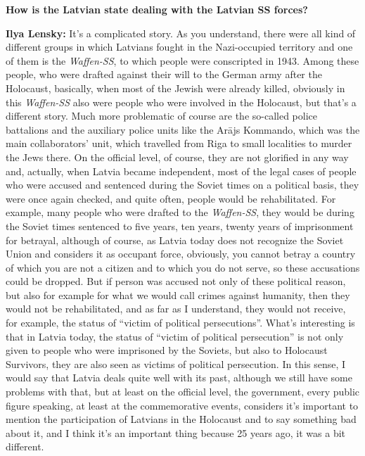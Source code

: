 \textbf{How is the Latvian state dealing with the Latvian SS forces?}

\textbf{Ilya Lensky:} It’s a complicated story. As you understand, there were all kind of different groups in which Latvians fought in the Nazi-occupied territory and one of them is the \textit{Waffen-SS}, to which people were conscripted in 1943. Among these people, who were drafted against their will to the German army after the Holocaust, basically, when most of the Jewish were already killed, obviously in this \textit{Waffen-SS} also were people who were involved in the Holocaust, but that’s a different story. Much more problematic of course are the so-called police battalions and the auxiliary police units like the Arājs Kommando, which was the main collaborators’ unit, which travelled from Riga to small localities to murder the Jews there. On the official level, of course, they are not glorified in any way and, actually, when Latvia became independent, most of the legal cases of people who were accused and sentenced during the Soviet times on a political basis, they were once again checked, and quite often, people would be rehabilitated. For example, many people who were drafted to the \textit{Waffen-SS}, they would be during the Soviet times sentenced to five years, ten years, twenty years of imprisonment for betrayal, although of course, as Latvia today does not recognize the Soviet Union and considers it as occupant force, obviously, you cannot betray a country of which you are not a citizen and to which you do not serve, so these accusations could be dropped. But if person was accused not only of these political reason, but also for example for what we would call crimes against humanity, then they would not be rehabilitated, and as far as I understand, they would not receive, for example, the status of ``victim of political persecutions''. What’s interesting is that in Latvia today, the status of ``victim of political persecution'' is not only given to people who were imprisoned by the Soviets, but also to Holocaust Survivors, they are also seen as victims of political persecution. In this sense, I would say that Latvia deals quite well with its past, although we still have some problems with that, but at least on the official level, the government, every public figure speaking, at least at the commemorative events, considers it’s important to mention the participation of Latvians in the Holocaust and to say something bad about it, and I think it's an important thing because 25 years ago, it was a bit different. 

